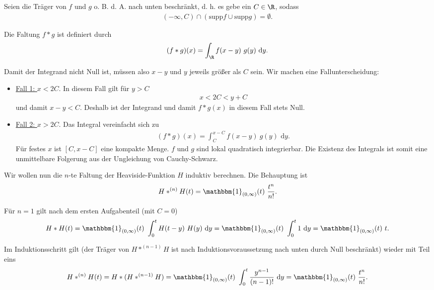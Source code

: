 \begin{solution}

  Seien die Träger von $f$ und $g$ o. B. d. A. nach unten beschränkt, d. h. es gebe ein $C \in \R$, sodass
  \begin{align}
      (-\infty, C) \cap (\text{supp} f \cup \text{supp} g) = \emptyset.
  \end{align}

  Die Faltung $f \ast g$ ist definiert durch
  \begin{align}
      (f \ast g)(x) = \int_\R f(x-y) ~g(y) \text{~d}y.
  \end{align}

  Damit der Integrand nicht Null ist, müssen also $x - y$ und $y$ jeweils größer als $C$ sein. Wir machen eine Fallunterscheidung:

  \begin{itemize}
      \item \underline{Fall 1: $x < 2C.$} In diesem Fall gilt für $y > C$
      \begin{align}
          x < 2C < y + C
      \end{align} und damit $x - y < C$. Deshalb ist der Integrand und damit $f \ast g(x)$ in diesem Fall stets Null.
      \item \underline{Fall 2: $x > 2C.$} Das Integral vereinfacht sich zu
  \begin{align}
     (f \ast g)(x) = \int_{C}^{x-C} f(x-y) ~g(y) \text{~d}y.
  \end{align}
  Für festes $x$ ist $[C, x-C]$ eine kompakte Menge. $f$ und $g$ sind lokal quadratisch integrierbar. Die Existenz des Integrals ist somit eine unmittelbare Folgerung aus der Ungleichung von Cauchy-Schwarz.
  \end{itemize}

  Wir wollen nun die $n$-te Faltung der Heaviside-Funktion $H$ induktiv berechnen. Die Behauptung ist
  \begin{align}
      H \ast^{(n)} H(t) = \mathbbm{1}_{(0, \infty)} (t) ~ \frac{t^n}{n!}.
  \end{align}

  Für $n = 1$ gilt nach dem ersten Aufgabenteil (mit $C = 0$)
  \begin{align}
      H \ast H(t) = \mathbbm{1}_{(0, \infty)} (t) ~ \int_0^t H(t-y) ~H(y) \text{~d}y = \mathbbm{1}_{(0, \infty)} (t) ~ \int_0^t 1 \text{~d}y = \mathbbm{1}_{(0, \infty)} (t) ~ t.
  \end{align}

  Im Induktionsschritt gilt (der Träger von $H \ast^{(n-1)} H$ ist nach Induktionsvoraussetzung nach unten durch Null beschränkt) wieder mit Teil eins
  \begin{align}
      H \ast^{(n)} H(t) = H \ast (H \ast^{(n-1)} H) = \mathbbm{1}_{(0, \infty)}(t) ~ \int_0^t \frac{y^{n-1}}{(n-1)!} \text{~d}y =  \mathbbm{1}_{(0, \infty)}(t) ~ \frac{t^n}{n!}.
  \end{align}
\end{solution}

